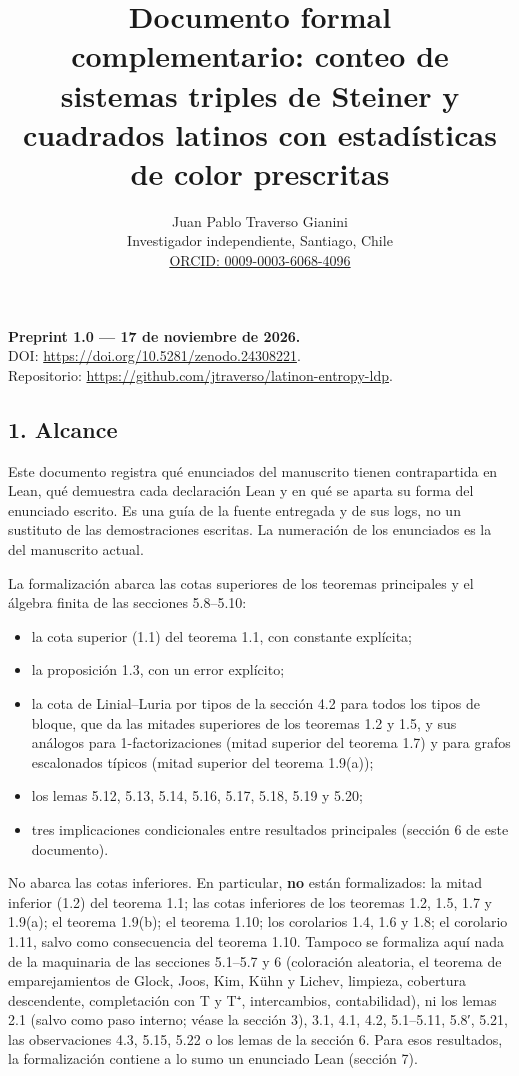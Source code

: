\documentclass[spanish,11pt,a4paper]{article}
\title{Documento formal complementario: conteo de sistemas triples de Steiner y cuadrados latinos con estadísticas de color prescritas}
\author{Juan Pablo Traverso Gianini\\\small Investigador independiente, Santiago, Chile\\\small \href{https://orcid.org/0009-0003-6068-4096}{ORCID: 0009-0003-6068-4096}}
\date{}
\providecommand{\tightlist}{\setlength{\itemsep}{0pt}\setlength{\parskip}{0pt}}
\begin{document}
\raggedbottom\maketitle
\begin{center}
\textbf{Preprint 1.0 --- 17 de noviembre de 2026.}\\
DOI: \url{https://doi.org/10.5281/zenodo.24308221}.\\
Repositorio: \url{https://github.com/jtraverso/latinon-entropy-ldp}.
\end{center}

\subsection{1. Alcance}\label{alcance}

Este documento registra qué enunciados del manuscrito tienen contrapartida en Lean, qué demuestra cada declaración Lean y en qué se aparta su forma del enunciado escrito. Es una guía de la fuente entregada  y de sus logs, no un sustituto de las demostraciones escritas. La numeración de los enunciados es la del manuscrito actual.

La formalización abarca las cotas superiores de los teoremas principales y el álgebra finita de las secciones 5.8--5.10:

\begin{itemize}
\tightlist
\item
  la cota superior (1.1) del teorema 1.1, con constante explícita;
\item
  la proposición 1.3, con un error explícito;
\item
  la cota de Linial--Luria por tipos de la sección 4.2 para todos los tipos de bloque, que da las mitades superiores de los teoremas 1.2 y 1.5, y sus análogos para 1-factorizaciones (mitad superior del teorema 1.7) y para grafos escalonados típicos (mitad superior del teorema 1.9(a));
\item
  los lemas 5.12, 5.13, 5.14, 5.16, 5.17, 5.18, 5.19 y 5.20;
\item
  tres implicaciones condicionales entre resultados principales (sección 6 de este documento).
\end{itemize}

No abarca las cotas inferiores. En particular, \textbf{no} están formalizados: la mitad inferior (1.2) del teorema 1.1; las cotas inferiores de los teoremas 1.2, 1.5, 1.7 y 1.9(a); el teorema 1.9(b); el teorema 1.10; los corolarios 1.4, 1.6 y 1.8; el corolario 1.11, salvo como consecuencia del teorema 1.10. Tampoco se formaliza aquí nada de la maquinaria de las secciones 5.1--5.7 y 6 (coloración aleatoria, el teorema de emparejamientos de Glock, Joos, Kim, Kühn y Lichev, limpieza, cobertura descendente, completación con T y T⁺, intercambios, contabilidad), ni los lemas 2.1 (salvo como paso interno; véase la sección 3), 3.1, 4.1, 4.2, 5.1--5.11, 5.8′, 5.21, las observaciones 4.3, 5.15, 5.22 o los lemas de la sección 6. Para esos resultados, la formalización contiene a lo sumo un enunciado Lean (sección 7).
\end{document}
